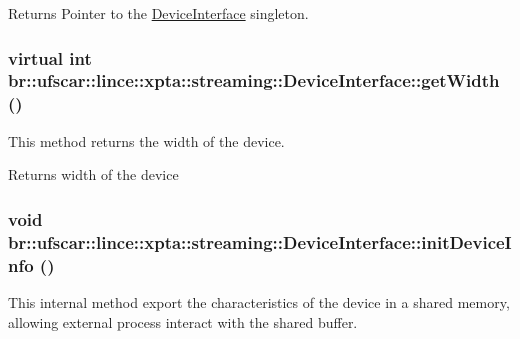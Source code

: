 \begin{DoxyReturn}{Returns}
Pointer to the \hyperlink{classbr_1_1ufscar_1_1lince_1_1xpta_1_1streaming_1_1DeviceInterface}{DeviceInterface} singleton. 
\end{DoxyReturn}
\hypertarget{classbr_1_1ufscar_1_1lince_1_1xpta_1_1streaming_1_1DeviceInterface_ac0604d57e99494950d7e7bb7f2dc8f51}{
\subsubsection[{getWidth}]{\setlength{\rightskip}{0pt plus 5cm}virtual int br::ufscar::lince::xpta::streaming::DeviceInterface::getWidth ()}}
\label{classbr_1_1ufscar_1_1lince_1_1xpta_1_1streaming_1_1DeviceInterface_ac0604d57e99494950d7e7bb7f2dc8f51}


This method returns the width of the device. 

\begin{DoxyReturn}{Returns}
width of the device 
\end{DoxyReturn}
\hypertarget{classbr_1_1ufscar_1_1lince_1_1xpta_1_1streaming_1_1DeviceInterface_aabfb7ff2502e61a58985a8d0a5d344a3}{
\subsubsection[{initDeviceInfo}]{\setlength{\rightskip}{0pt plus 5cm}void br::ufscar::lince::xpta::streaming::DeviceInterface::initDeviceInfo ()}}
\label{classbr_1_1ufscar_1_1lince_1_1xpta_1_1streaming_1_1DeviceInterface_aabfb7ff2502e61a58985a8d0a5d344a3}


This internal method export the characteristics of the device in a shared memory, allowing external process interact with the shared buffer. 

